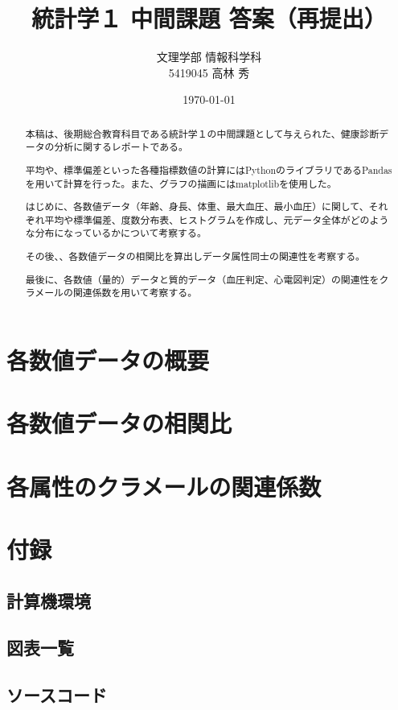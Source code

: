 \documentclass[dvipdfmx]{jsarticle}
\title{統計学１ 中間課題 答案（再提出）}
\author{文理学部 情報科学科\\5419045 高林 秀}
\date{\today}
\begin{document}
\maketitle

\begin{abstract}
    本稿は、後期総合教育科目である統計学１の中間課題として与えられた、健康診断データの分析に関するレポートである。\par 
    平均や、標準偏差といった各種指標数値の計算にはPythonのライブラリであるPandasを用いて計算を行った。また、グラフの描画にはmatplotlibを使用した。\par 
    はじめに、各数値データ（年齢、身長、体重、最大血圧、最小血圧）に関して、それぞれ平均や標準偏差、度数分布表、ヒストグラムを作成し、元データ全体がどのような分布になっているかについて考察する。\par 
    その後、、各数値データの相関比を算出しデータ属性同士の関連性を考察する。\par 
    最後に、各数値（量的）データと質的データ（血圧判定、心電図判定）の関連性をクラメールの関連係数を用いて考察する。
\end{abstract}
\tableofcontents

\section{各数値データの概要}
\section{各数値データの相関比}
\section{各属性のクラメールの関連係数}
\section*{付録}
    \subsection{計算機環境}
    \subsection{図表一覧}
    \subsection{ソースコード}
\end{document}
